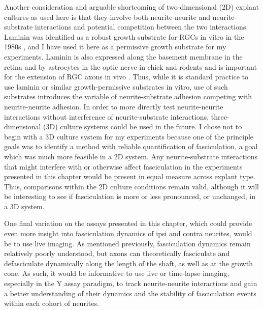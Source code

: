 Another consideration and arguable shortcoming of two-dimensional (2D) explant cultures as used here is that they involve both neurite-neurite and neurite-substrate interactions and potential competition between the two interactions.
Laminin was identified as a robust growth substrate for RGCs in vitro in the 1980s \cite{smalheiser1984laminin,cohen1985retinal}, and I have used it here as a permissive growth substrate for my experiments.
Laminin is also expressed along the basement membrane in the retina and by astrocytes in the optic nerve in chick and rodents and is important for the extension of RGC axons in vivo \cite{cohen1987role,liesi1988astrocyte,sarthy1990localization,morissette1995laminin}.
Thus, while it is standard practice to use laminin or similar growth-permissive substrates in vitro, use of such substrates introduces the variable of neurite-substrate adhesion competing with neurite-neurite adhesion.
In order to more directly test neurite-neurite interactions without interference of neurite-substrate interactions, three-dimensional (3D) culture systems could be used in the future.
I chose not to begin with a 3D culture system for my experiments because one of the principle goals was to identify a method with reliable quantification of fasciculation, a goal which was much more feasible in a 2D system.
Any neurite-substrate interactions that might interfere with or otherwise affect fasciculation in the experiments presented in this chapter would be present in equal measure across explant type.
Thus, comparisons within the 2D culture conditions remain valid, although it will be interesting to see if fasciculation is more or less pronounced, or unchanged, in a 3D system.

One final variation on the assays presented in this chapter, which could provide even more insight into fasciculation dynamics of ipsi and contra neurites, would be to use live imaging. 
As mentioned previously, fasciculation dynamics remain relatively poorly understood, but axons can theoretically fasciculate and defasciculate dynamically along the length of the shaft, as well as at the growth cone.
As such, it would be informative to use live or time-lapse imaging, especially in the Y assay paradigm, to track neurite-neurite interactions and gain a better understanding of their dynamics and the stability of fasciculation events within each cohort of neurites.
